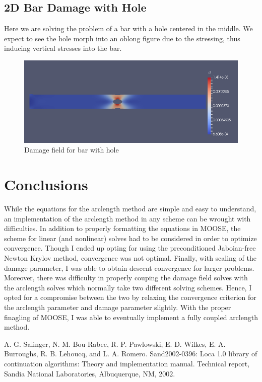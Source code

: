 \documentclass[10pt,a4paper]{article}
\begin{document}
	\subsection{2D Bar Damage with Hole}
	Here we are solving the problem of a bar with a hole centered in the middle. We expect to see the hole morph into an oblong figure due to the stressing, thus inducing vertical stresses into the bar. 
	
	
	
\begin{figure}[h!]
\centering
\includegraphics[width=0.7\linewidth]{barwithhole}
\caption{Damage field for bar with hole}
\label{fig:barwithhole}
\end{figure}
	
	\section{Conclusions}
	While the equations for the arclength method are simple and easy to understand, an implementation of the arclength method in any scheme can be wrought with difficulties. In addition to properly formatting the equations in MOOSE, the scheme for linear (and nonlinear) solves had to be considered in order to optimize convergence. Though I ended up opting for using the preconditioned Jaboian-free Newton Krylov method, convergence was not optimal. Finally, with scaling of the damage parameter, I was able to obtain descent convergence for larger problems. Moreover, there was difficulty in properly couping the damage field solves with the arclength solves which normally take two different solving schemes. Hence, I opted for a compromise between the two by relaxing the convergence criterion for the arclength parameter and damage parameter slightly. With the proper finagling of MOOSE, I was able to eventually implement a fully coupled arclength method.
	
	\begin{thebibliography}{9}
			A. G. Salinger, N. M. Bou-Rabee, R. P. Pawlowski, E. D. Wilkes, E. A.
		Burroughs, R. B. Lehoucq, and L. A. Romero. Sand2002-0396: Loca 1.0
		library of continuation algorithms: Theory and implementation manual.
		Technical report, Sandia National Laboratories, Albuquerque, NM, 2002.
	\end{thebibliography}

	
	
\end{document}
